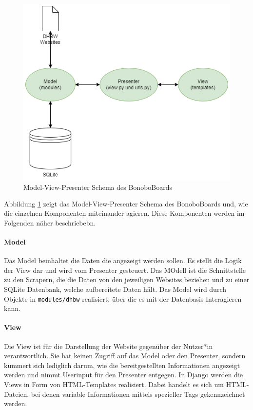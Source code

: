 \documentclass[a4paper,11pt]{scrartcl}
\begin{document}
\begin{figure}[H]
	\includegraphics[width=\textwidth]{MVP}
	\caption{Model-View-Presenter Schema des BonoboBoards}
	\label{img:MVP}
\end{figure}

Abbildung \ref{img:MVP} zeigt das Model-View-Presenter Schema des BonoboBoards und, wie die einzelnen Komponenten miteinander agieren. Diese Komponenten werden im Folgenden näher beschriebebn.

\paragraph{Model}
Das Model beinhaltet die Daten die angezeigt werden sollen. Es stellt die Logik der View dar und wird vom Presenter gesteuert. Das MOdell ist die Schnittstelle zu den Scrapern, die die Daten von den jeweiligen Websites beziehen und zu einer SQLite Datenbank, welche aufbereitete Daten hält. Das Model wird durch Objekte in \texttt{modules/dhbw} realisiert, über die es mit der Datenbasis Interagieren kann.

\paragraph{View}
Die View ist für die Darstellung der Website gegenüber der Nutzer*in verantwortlich. Sie hat keinen Zugriff auf das Model oder den Presenter, sondern kümmert sich lediglich darum, wie die bereitgestellten Informationen angezeigt werden und nimmt Userinput für den Presenter entgegen. In Django werden die Views in Form von HTML-Templates realisiert. Dabei handelt es sich um HTML-Dateien, bei denen variable Informationen mittels spezieller Tags gekennzeichnet werden.
\end{document}
